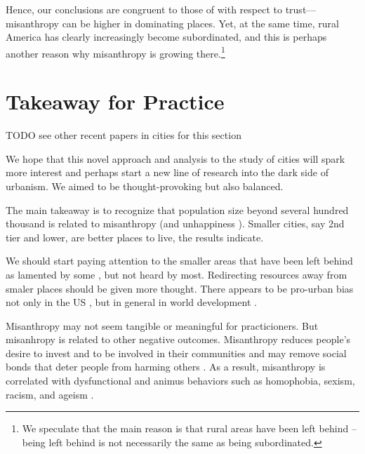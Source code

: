\documentclass[10pt, letterpaper]{article}
\begin{document}
\begin{spacing}{1.4}
Hence, our conclusions are congruent to those of \citet{schilke15} with respect to trust---misanthropy can be higher in dominating places. Yet, at the same
 time, rural America has clearly increasingly become subordinated, and this is perhaps another reason why misanthropy is growing there.\footnote{We speculate that the main reason is that rural areas have been left behind \citep{hansonCityJournalautumn15,hansonCJ17winter17,fullerNYT17monD}--being left behind is not necessarily the same as being subordinated.}  

\section*{Takeaway for Practice}
TODO see other recent papers in cities for this section

We hope that this novel approach and analysis to the study of cities will spark
more interest and perhaps start a new line of research into the dark side of
urbanism. We aimed to be thought-provoking but also balanced.

%
The main takeaway is to recognize that population size beyond several hundred
thousand is related to misanthropy (and unhappiness
\citep{aok-ls_fisher16}). Smaller cities, say 2nd tier and lower, are better
places to live, the results indicate. %

We should start paying attention to the smaller areas that
have been left behind as lamented by some \citep[e.g.,][]{fullerNYT17monD,hansonCityJournalautumn15}, but not heard by most.
Redirecting resources away from smaler places should be given more thought. %
There appears to be pro-urban bias not only in the US \cite{hansonCityJournalautumn15}, but in
general in world development \citep{lipton77}.

Misanthropy may not seem tangible or meaningful for practicioners. 
But misanhropy is related to other negative
outcomes.  Misanthropy reduces people's desire to invest and to be involved in their
 communities and may remove social bonds that deter people from harming others
 \citep{weaver2006,hirschi1993,fafchamps2006,walters2013}. As a result,
 misanthropy is correlated with dysfunctional and animus behaviors such as
 homophobia, sexism, racism, and ageism \citep{cattacin2006}. %


\end{spacing}
\end{document}
